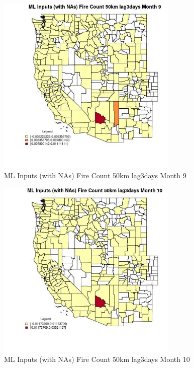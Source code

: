 \begin{figure} 
\centering  
\includegraphics[width=0.77\textwidth]{Code_Outputs/Report_ML_input_PM25_Step4_part_e_de_duplicated_aves_compiled_2019-05-21wNAs_CountyFire_Count_50km_lag3daysmedianMonth9.jpg} 
\caption{\label{fig:Report_ML_input_PM25_Step4_part_e_de_duplicated_aves_compiled_2019-05-21wNAsCountyFire_Count_50km_lag3daysmedianMonth9}ML Inputs (with NAs) Fire Count 50km lag3days Month 9} 
\end{figure} 
 

\begin{figure} 
\centering  
\includegraphics[width=0.77\textwidth]{Code_Outputs/Report_ML_input_PM25_Step4_part_e_de_duplicated_aves_compiled_2019-05-21wNAs_CountyFire_Count_50km_lag3daysmedianMonth10.jpg} 
\caption{\label{fig:Report_ML_input_PM25_Step4_part_e_de_duplicated_aves_compiled_2019-05-21wNAsCountyFire_Count_50km_lag3daysmedianMonth10}ML Inputs (with NAs) Fire Count 50km lag3days Month 10} 
\end{figure} 
 

